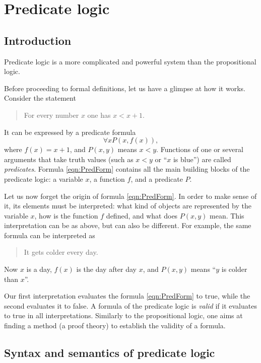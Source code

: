 \chapter{Predicate logic}
\section*{Introduction}
Predicate logic is a more complicated and powerful system than the propositional logic.

Before proceeding to formal definitions, let us have a glimpse at how it works.
Consider the statement
\begin{quote}
For every number $x$ one has $x < x+1$.
\end{quote}
It can be expressed by a predicate formula
\begin{equation}
\label{eqn:PredForm}
\forall x P(x, f(x)),
\end{equation}
where $f(x) = x+1$, and $P(x,y)$ means $x < y$.
Functions of one or several arguments that take truth values (such as $x < y$ or ``$x$ is blue'') are called \emph{predicates}.
Formula \eqref{eqn:PredForm} contains all the main building blocks of the predicate logic: a variable $x$, a function $f$, and a predicate $P$.

Let us now forget the origin of formula \eqref{eqn:PredForm}.
In order to make sense of it, its elements must be interpreted:
what kind of objects are represented by the variable $x$, how is the function $f$ defined, and what does $P(x,y)$ mean.
This interpretation can be as above, but can also be different.
For example, the same formula can be interpreted as
\begin{quote}
It gets colder every day.
\end{quote}
Now $x$ is a day, $f(x)$ is the day after day $x$, and $P(x,y)$ means ``$y$ is colder than $x$''.

Our first interpretation evaluates the formula \eqref{eqn:PredForm} to true, while the second evaluates it to false.
A formula of the predicate logic is \emph{valid} if it evaluates to true in all interpretations.
Similarly to the propositional logic, one aims at finding a method (a proof theory) to establish the validity of a formula.



\section{Syntax and semantics of predicate logic}
